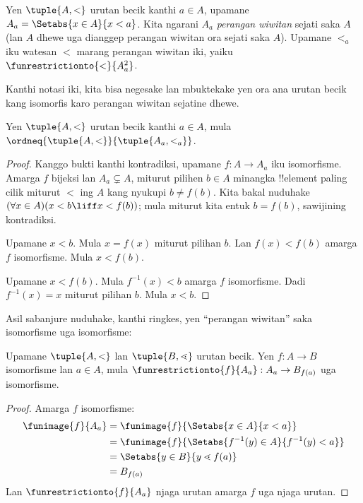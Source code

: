 \documentclass[../../../include/open-logic-section]{subfiles}
\begin{document}
\begin{defn}
Yen $\tuple{A, <}$ urutan becik kanthi $a \in A$,
upamane $A_a = \Setabs{x \in A}{x < a}$. Kita
ngarani $A_a$ \emph{perangan wiwitan} sejati saka
$A$ (lan $A$ dhewe uga dianggep perangan wiwitan
ora sejati saka $A$). Upamane $<_a$ iku watesan
$<$ marang perangan wiwitan iki, yaiku
$\funrestrictionto{\mathord{<}}{A_a^2}$.
\end{defn}
\noindent
Kanthi notasi iki, kita bisa negesake lan mbuktekake
yen ora ana urutan becik kang isomorfis karo
perangan wiwitan sejatine dhewe.

\begin{lem}
Yen $\tuple{A, <}$ urutan becik kanthi $a \in A$,
mula $\ordneq{\tuple{A, <}}{\tuple{A_a, <_a}}$.
\end{lem}

\begin{proof}
Kanggo bukti kanthi kontradiksi, upamane
$f \colon A \to A_a$ iku isomorfisme. Amarga $f$
bijeksi lan $A_a \subsetneq A$, miturut
 pilihen $b \in A$
minangka !!{element} paling cilik miturut $<$ ing
$A$ kang nyukupi $b \neq f(b)$. Kita bakal nuduhake
$(\forall x \in A)(x<b \liff x < f(b))$; mula miturut
kita entuk $b = f(b)$, sawijining kontradiksi.

Upamane $x < b$. Mula $x = f(x)$ miturut pilihan
$b$. Lan $f(x) < f(b)$ amarga $f$ isomorfisme.
Mula $x < f(b)$.

Upamane $x < f(b)$. Mula $f^{-1}(x) < b$
amarga $f$ isomorfisme. Dadi $f^{-1}(x) = x$
miturut pilihan $b$. Mula $x < b$.
\end{proof}

Asil sabanjure nuduhake, kanthi ringkes, yen
``perangan wiwitan'' saka isomorfisme uga isomorfisme:

\begin{lem}
Upamane $\tuple{A, <}$ lan $\tuple{B, \lessdot}$
urutan becik. Yen $f \colon A \to B$ isomorfisme
lan $a \in A$, mula
$\funrestrictionto{f}{A_{a}} : A_a \to B_{f(a)}$
uga isomorfisme.
\end{lem}

\begin{proof}
Amarga $f$ isomorfisme:
\begin{align*}
	\funimage{f}{A_a} &= \funimage{f}{\Setabs{x \in A}{x < a}}\\
	&= \funimage{f}{\Setabs{f^{-1}(y) \in A}{f^{-1}(y) < a}} \\
	&= \Setabs{y \in B}{y \lessdot f(a)} \\
	&=B_{f(a)} 
\end{align*}
Lan $\funrestrictionto{f}{A_a}$ njaga urutan amarga
$f$ uga njaga urutan.
\end{proof}
\end{document}
